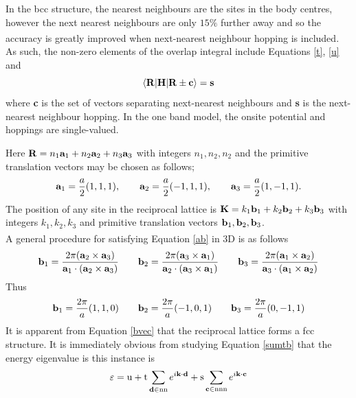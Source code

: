 \documentclass[a4paper, 12pt]{article}
\begin{document}
In the \gls{bcc} structure, the nearest neighbours are the sites in the body centres, however the next nearest neighbours are only $15\%$ further away and so the accuracy is greatly improved when next-nearest neighbour hopping is included\textsuperscript{\textcolor{blue}{\cite{harrison}}}.
As such, the non-zero elements of the overlap integral include Equations \eqref{t}, \eqref{u} and
		\begin{equation}\label{s}
			\langle{\bf R}|{\bf H}|{\bf R}\pm {\bf c}\rangle = \bf s
		\end{equation}
		where {\bf c} is the set of vectors separating next-nearest neighbours and {\bf s} is the next-nearest neighbour hopping. In the one band model, the onsite potential and hoppings are single-valued.

		Here ${\bf R} = n_1{\bf a}_1 + n_2{\bf a}_2 + n_3{\bf a}_3$ with integers $n_1,n_2,n_2$ and the primitive translation vectors may be chosen as follows;
		\begin{equation}
		{\bf a}_1 = \frac{a}{2}(1,1,1),\qquad {\bf a}_2 = \frac{a}{2}(-1,1,1),\qquad {\bf a}_3=\frac{a}{2}(1,-1,1). 
		\end{equation}
		The position of any site in the reciprocal lattice is ${\bf K} = k_1{\bf b}_1 + k_2{\bf b}_2 + k_3{\bf b}_3$ with integers $k_1,k_2,k_3$ and primitive translation vectors ${\bf b}_1,{\bf b}_2,{\bf b}_3$. 
		\\A general procedure for satisfying Equation \eqref{ab} in 3D is as follows\textsuperscript{\textcolor{blue}{\cite{datta}}}
		\begin{equation}
			{\bf b}_1 = \frac{2\pi({\bf a}_2 \times {\bf a}_3)}{{\bf a}_1\cdot ({\bf a}_2 \times {\bf a}_3)}
			\qquad {\bf b}_2 = \frac{2\pi({\bf a}_3 \times {\bf a}_1)}{{\bf a}_2\cdot ({\bf a}_3 \times {\bf a}_1)}
			\qquad {\bf b}_3 = \frac{2\pi({\bf a}_1 \times {\bf a}_2)}{{\bf a}_3\cdot ({\bf a}_1 \times {\bf a}_2)}
		\end{equation}
		Thus
		\begin{equation}\label{bvec}
			{\bf b}_1 = \frac{2\pi}{a}(1,1,0)\qquad {\bf b}_2 = \frac{2\pi}{a}(-1,0,1)\qquad {\bf b}_3 = \frac{2\pi}{a}(0,-1,1)
		\end{equation}
		It is apparent from Equation \eqref{bvec} that the reciprocal lattice forms a \gls{fcc} structure.
		It is immediately obvious from studying Equation \eqref{sumtb} that the energy eigenvalue is this instance is
		\begin{equation}\label{ebcc}
			\varepsilon = {\rm u} + {\rm t}\sum_{{\bf d}\in {\rm nn}} e^{i{\bf k \cdot d}} + {\rm s}\sum_{{\bf c}\in {\rm nnn}} e^{i{\bf k \cdot c}}
		\end{equation}
\end{document}
